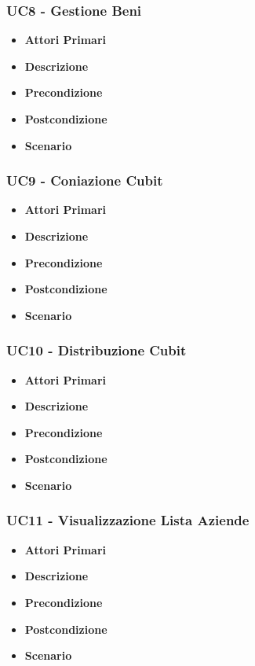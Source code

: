 \subsubsection{UC8 - Gestione Beni}
\begin{itemize}
	\item \textbf{Attori Primari}
	\item \textbf{Descrizione}
	\item \textbf{Precondizione}
	\item \textbf{Postcondizione}
	\item \textbf{Scenario}
\end{itemize}
\subsubsection{UC9 -  Coniazione Cubit}
\begin{itemize}
	\item \textbf{Attori Primari}
	\item \textbf{Descrizione}
	\item \textbf{Precondizione}
	\item \textbf{Postcondizione}
	\item \textbf{Scenario}
\end{itemize}
\subsubsection{UC10 - Distribuzione Cubit}
\begin{itemize}
	\item \textbf{Attori Primari}
	\item \textbf{Descrizione}
	\item \textbf{Precondizione}
	\item \textbf{Postcondizione}
	\item \textbf{Scenario}
\end{itemize}
\subsubsection{UC11 - Visualizzazione Lista Aziende}
\begin{itemize}
	\item \textbf{Attori Primari}
	\item \textbf{Descrizione}
	\item \textbf{Precondizione}
	\item \textbf{Postcondizione}
	\item \textbf{Scenario}
\end{itemize}

